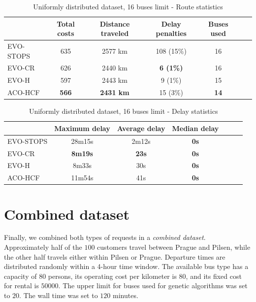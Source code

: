 \begin{table}
    \centering
    \begin{tabular}{lcccccc}
         & Total costs & Distance traveled & Delay penalties & Buses used \\
         \hline
         EVO-STOPS & 635 & 2577 km & 108 (15\%) & 16 \\
         EVO-CR & 626 & 2440 km & \textbf{6 (1\%)} & 16 \\
         EVO-H & 597 & 2443 km & 9 (1\%) & 15 \\
         ACO-HCF & \textbf{566} & \textbf{2431 km} & 15 (3\%) & \textbf{14} \\
    \end{tabular}
    \caption{Uniformly distributed dataset, 16 buses limit - Route statistics}
    \label{tab:exp_random_16_route_stats}
\end{table}

\begin{table}
    \centering
    \begin{tabular}{lcccccc}
         &  Maximum delay & Average delay & Median delay \\
         \hline
         EVO-STOPS & 28m15s & 2m12s & \textbf{0s} \\
         EVO-CR & \textbf{8m19s} & \textbf{23s} & \textbf{0s} \\
         EVO-H & 8m33s & 30s & \textbf{0s} \\
         ACO-HCF & 11m54s & 41s & \textbf{0s} \\
    \end{tabular}
    \caption{Uniformly distributed dataset, 16 buses limit - Delay statistics}
    \label{tab:exp_random_16_delay_stats}
\end{table}

\clearpage

\section{Combined dataset}

Finally, we combined both types of requests in a \textit{combined dataset}. Approximately half of the
$100$ customers travel between Prague and Pilsen, while the other half travels either within Pilsen or Prague. Departure times are distributed randomly within a 4-hour time window. The available bus type has a capacity of $80$ persons, its operating cost per kilometer is $80$, and its fixed cost for rental is $50000$. The upper limit for buses used for genetic algorithms was set to $20$. The wall time was set to $120$ minutes.

